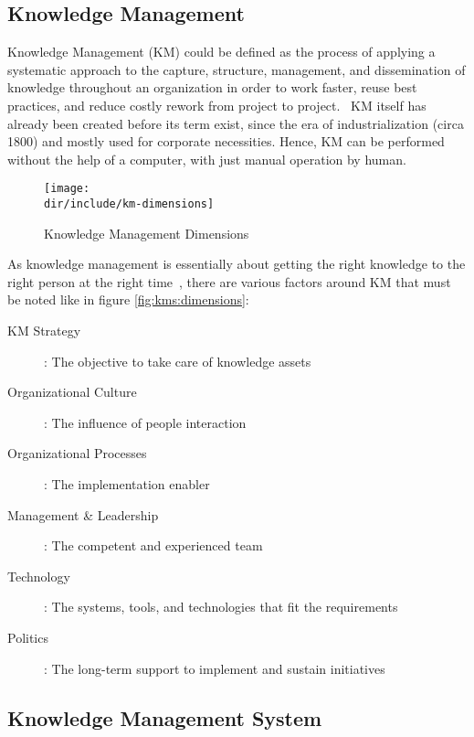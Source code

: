 \subsection{Knowledge Management}

Knowledge Management  (\ac{KM}) could be defined as the process of applying a systematic approach to the capture, structure, management, and dissemination of knowledge throughout an organization in order to work faster, reuse best practices, and reduce costly rework from project to project.~\autocite{Dalkir2005KM}
\ac{KM} itself has already been created before its term exist, since the era of industrialization (circa 1800) and mostly used for corporate necessities.
Hence, \ac{KM} can be performed without the help of a computer, with just manual operation by human.

\begin{figure}[htbp]
    \centering
    \texttt{[image: \\dir/include/km-dimensions]}
    \caption{Knowledge Management Dimensions}
    \label{fig:kms:dimensions}
\end{figure}

As knowledge management is essentially about getting the right knowledge to the right person at the right time~\autocite{Frost2010KM}, there are various factors around \ac{KM} that must be noted like in figure \autoref{fig:kms:dimensions}:

\begin{description}
  \item [KM Strategy]: The objective to take care of knowledge assets
  \item [Organizational Culture]: The influence of people interaction
  \item [Organizational Processes]: The implementation enabler
  \item [Management \& Leadership]: The competent and experienced team
  \item [Technology]: The systems, tools, and technologies that fit the requirements
  \item [Politics]: The long-term support to implement and sustain initiatives
\end{description}

\subsection{Knowledge Management System}

